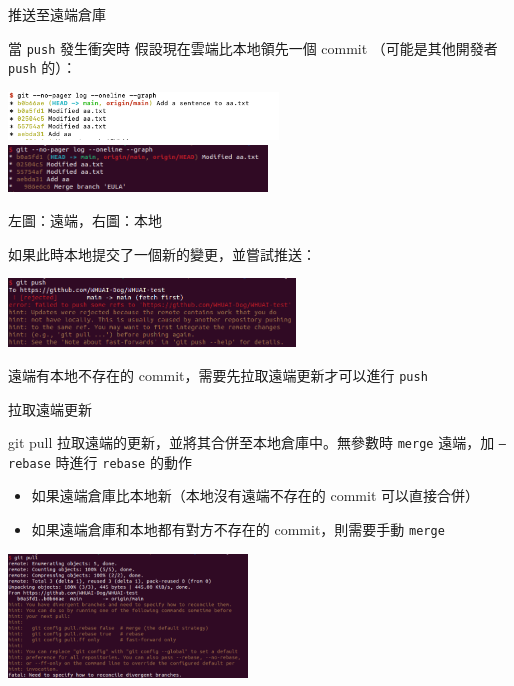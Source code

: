 \documentclass[xetex, unicode, 10pt, aspectratio=169]{beamer}
\begin{document}
\begin{frame}{推送至遠端倉庫}
    \begin{block}{當 \texttt{push} 發生衝突時}
        假設現在雲端比本地領先一個 commit （可能是其他開發者 \texttt{push} 的）：
        \begin{center}
            \includegraphics[height=0.5in]{./img/git-push-conflict-remote.png}
            \includegraphics[height=0.5in]{./img/git-push-conflict-local.png}

            左圖：遠端，右圖：本地
        \end{center}
        如果此時本地提交了一個新的變更，並嘗試推送：
        \begin{center}
            \includegraphics[width=3in]{./img/git-push-conflict.png}
            \pause

            遠端有本地不存在的 commit，需要先拉取遠端更新才可以進行 \texttt{push}
        \end{center}
    \end{block}
\end{frame}

\begin{frame}{拉取遠端更新}
    \begin{block}{git pull}
        \justifying\hspace{17pt}拉取遠端的更新，並將其合併至本地倉庫中。無參數時 \texttt{merge}
        遠端，加 \texttt{--rebase} 時進行 \texttt{rebase} 的動作
        \begin{itemize}
            \item 如果遠端倉庫比本地新（本地沒有遠端不存在的 commit 可以直接合併）
            \item 如果遠端倉庫和本地都有對方不存在的 commit，則需要手動 \texttt{merge}
        \end{itemize}
        \begin{center}
            \includegraphics[width=2.5in]{./img/git-pull-conflict.png}
        \end{center}
    \end{block}
\end{frame}
\end{document}
